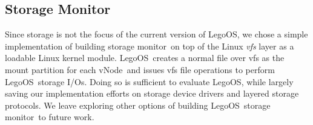 \documentclass[10pt,times,twocolumn]{z2-article}
\renewcommand{\em}{\it}
\newcommand{\lego}{LegoOS}
\newcommand{\vnode}{vNode}
\newcommand{\microos}{monitor}
\begin{document}
{{{{{{{\subsection{Storage Monitor}
Since storage is not the focus of the current version of \lego,
we chose a simple implementation of building storage \microos\ on top of the Linux {\em vfs} layer as a loadable Linux kernel module.
\lego\ creates a normal file over vfs as the mount partition for each \vnode\
and issues vfs file operations to perform \lego\ storage I/Os.
Doing so is sufficient to evaluate \lego, while largely saving our implementation efforts on storage device drivers and layered storage protocols.
We leave exploring other options of building \lego\ storage \microos\ to future work.

}}}}}}}
\end{document}
